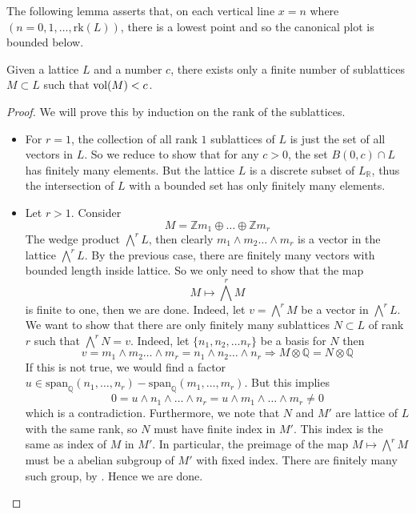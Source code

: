 The following lemma asserts that, on each vertical line $x =n$ where $(n=0,1,\ldots, \text{rk}(L))$, there is a lowest point and so the canonical plot is bounded below.
\begin{lemma}
    Given a lattice $L$ and a number $c$, there exists only a finite number of sublattices $M \subset L$ such that
    $\operatorname{vol}(M)<c$.
\end{lemma}
\begin{proof}
    We will prove this by induction on the rank of the sublattices.
    \begin{itemize}
        \item For $r =1$, the collection of all rank $1$ sublattices of $L$ is just the set of all vectors in $L$. So we reduce
              to show that for any $c>0$, the set $B(0,c) \cap L$  has finitely many elements. But the lattice $L$ is a discrete subset of $L_\mathbb{R}$, thus the intersection of $L$ with a bounded set has only finitely many elements.
        \item Let $r>1$. Consider
              \[M = \mathbb{Z}m_1\oplus \ldots \oplus\mathbb{Z}m_r\]
              The wedge product $\bigwedge^r L$, then clearly
              $m_1\wedge m_2\ldots \wedge m_r$ is a vector in the lattice  $\bigwedge^r L$.
              By the previous case, there are finitely
              many vectors with bounded length inside lattice. So we only need to show that the map
              \[ M \mapsto \bigwedge^r M \]
              is finite to one, then we are done. Indeed, let $v= \bigwedge^r M$ be a vector in $\bigwedge^r L$. We want to show that there are only finitely many sublattices $N \subset L$  of rank $r$  such that
              $\bigwedge^r N = v$. Indeed, let $\{n_1,n_2,\ldots n_r\}$ be a basis for $N$ then
              \[v = m_1\wedge m_2\ldots \wedge m_r = n_1\wedge n_2\ldots \wedge n_r \Rightarrow M \otimes \mathbb{Q} = N \otimes \mathbb{Q}\]
              If this is not true, we would find a factor $u \in \mathrm{span}_\mathbb{Q}(n_1,\ldots,n_r) - \mathrm{span}_\mathbb{Q}(m_1,\ldots,m_r)$. But this implies
              \[0 = u\wedge n_1 \wedge\ldots \wedge n_r = u \wedge m_1 \wedge \ldots \wedge m_r \ne 0\]
              which is a contradiction. Furthermore, we note that $N$ and $M'$ are lattice of $L$ with the same rank, so $N$ must have finite index in $M'$. This index is the same as index of $M$ in $M'$.
              In particular, the preimage of the map $M \mapsto \bigwedge^r M$ must be a abelian subgroup of $M'$ with fixed index.  There are finitely many such group, by
              \cite[Proposition A.1]{MR1460018}. Hence we are done. \qedhere
    \end{itemize}
\end{proof}
